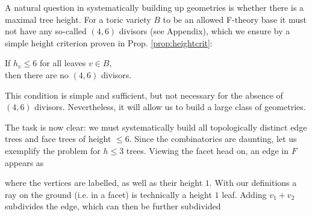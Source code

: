 \documentclass[aps,prl,twocolumn, superscriptaddress,groupedaddress,nofootinbib]{revtex4-1}
\begin{document}
A natural question
in systematically building up geometries is whether there is
a maximal tree height. For a toric variety $B$ to be an allowed
F-theory base it must not have any so-called $(4,6)$ divisors (see Appendix), which
we ensure by a simple height criterion proven in Prop. \ref{prop:heightcrit}:
\begin{center}
If $h_v\leq 6$ for all leaves $v\in B$, \\ then there are no $(4,6)$
divisors.
\end{center}
This condition is simple and sufficient, but not necessary
for the absence of $(4,6)$ divisors. Nevertheless, it
will allow us to build a large class of geometries.


\vspace{.5cm}
The task is now clear: we must systematically build  all
topologically distinct edge trees and face trees of height 
$\leq 6$. Since the combinatorics are daunting, let us
exemplify the problem for $h\leq 3$ trees. Viewing the
facet head on, an edge in $F$ appears as 
\begin{center}
\end{center}
where the vertices are labelled, as well as their height $1$.
With our definitions a ray on the ground (i.e. in a facet)
is technically a height $1$ leaf. Adding $v_1+v_2$ subdivides the
edge, which can then be further subdivided
\end{document}
